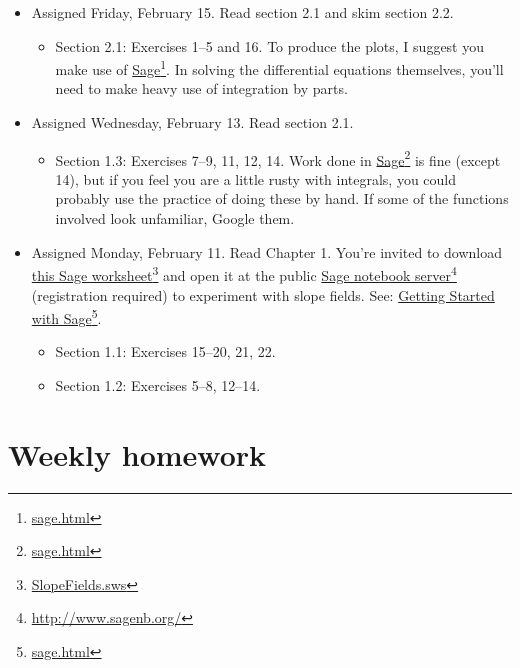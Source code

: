 \begin{itemize}
\item Assigned Friday, February 15. Read section 2.1 and skim section 2.2.

\begin{itemize}
\item Section 2.1: Exercises 1--5 and 16. To produce the plots, I suggest you make use of \href{sage.html}{Sage}\footnote{\href{sage.html}{sage.html}}. In solving the differential equations themselves, you'll need to make heavy use of integration by parts.

\end{itemize}

\item Assigned Wednesday, February 13. Read section 2.1.

\begin{itemize}
\item Section 1.3: Exercises 7--9, 11, 12, 14. Work done in \href{sage.html}{Sage}\footnote{\href{sage.html}{sage.html}} is fine (except 14), but if you feel you are a little rusty with integrals, you could probably use the practice of doing these by hand. If some of the functions involved look unfamiliar, Google them.

\end{itemize}

\item Assigned Monday, February 11. Read Chapter 1. You're invited to download \href{SlopeFields.sws}{this Sage worksheet}\footnote{\href{SlopeFields.sws}{SlopeFields.sws}} and open it at the public \href{http://www.sagenb.org/}{Sage notebook server}\footnote{\href{http://www.sagenb.org/}{http:/\slash www.sagenb.org\slash }} (registration required) to experiment with slope fields. See: \href{sage.html}{Getting Started with Sage}\footnote{\href{sage.html}{sage.html}}.

\begin{itemize}
\item Section 1.1: Exercises 15--20, 21, 22.

\item Section 1.2: Exercises 5--8, 12--14.

\end{itemize}

\end{itemize}

\section{Weekly homework}
\label{weekly}


